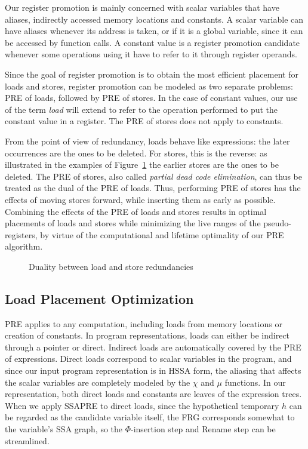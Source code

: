 Our register promotion is mainly concerned with scalar variables that have aliases, indirectly accessed memory locations and constants. 
A scalar variable can have aliases whenever its address is taken, or if it is a global variable, since it can be accessed by function calls. 
A constant value is a register promotion candidate whenever some operations using it have to refer to it through register operands. 

Since the goal of register promotion is to obtain the most efficient placement for loads and stores, register promotion can be modeled as two separate problems: 
PRE of loads, followed by PRE of stores. 
In the case of constant values, our use of the term \emph{load} will extend to refer to the operation performed to put the constant value in a register. 
The PRE of stores does not apply to constants.

From the point of view of redundancy, loads behave like expressions: 
the later occurrences are the ones to be deleted. 
For stores, this is the reverse: 
as illustrated in the examples of Figure~\ref{fig:load-store-dual} the earlier stores are the ones to be deleted. 
The PRE of stores, also called \emph{partial dead code elimination}, can thus be treated as the dual of the PRE of loads. 
Thus, performing PRE of stores has the effects of moving stores forward, while inserting them as early as possible. 
Combining the effects of the PRE of loads and stores results in optimal placements of loads and stores while minimizing the live ranges of the pseudo-registers, by virtue of the computational and lifetime optimality of our PRE algorithm.

\begin{figure}
\centering
\hfill
{}
\caption{Duality between load and store redundancies}
\label{fig:load-store-dual}
\end{figure}

\subsection{Load Placement Optimization}
PRE applies to any computation, including loads from memory locations or creation of constants. 
In program representations, loads can either be indirect through a pointer or direct. 
Indirect loads are automatically covered by the PRE of expressions. 
Direct loads correspond to scalar variables in the program, and since our input program representation is in HSSA form, the aliasing that affects the scalar variables are completely modeled by the $\chi$ and $\mu$ functions. 
In our representation, both direct loads and constants are leaves of the expression trees. 
When we apply SSAPRE to direct loads, since the hypothetical temporary $h$ can be regarded as the candidate variable itself, the FRG corresponds somewhat to the variable's SSA graph, so the $\Phi$-insertion step and Rename step can be streamlined.

